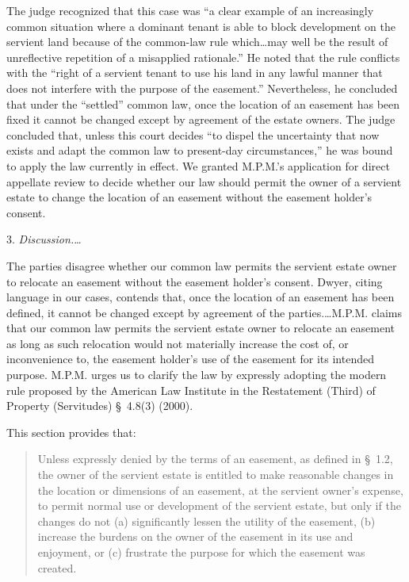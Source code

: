 The judge recognized that this case was ``a clear example of an increasingly
common situation where a dominant tenant is able to block development on the
servient land because of the common-law rule which\ldots may well be the result
of unreflective repetition of a misapplied rationale.'' He noted that the rule
conflicts with the ``right of a servient tenant to use his land in any lawful
manner that does not interfere with the purpose of the easement.'' Nevertheless,
he concluded that under the ``settled'' common law, once the location of an
easement has been fixed it cannot be changed except by agreement of the estate
owners. The judge concluded that, unless this court decides ``to dispel the
uncertainty that now exists and adapt the common law to present-day
circumstances,'' he was bound to apply the law currently in effect. We granted
M.P.M.'s application for direct appellate review to decide whether our law
should permit the owner of a servient estate to change the location of an
easement without the easement holder's consent.

3. \textit{Discussion.}\dots 

The parties disagree whether our common law permits the servient estate owner to
relocate an easement without the easement holder's consent. Dwyer, citing
language in our cases, contends that, once the location of an easement has been
defined, it cannot be changed except by agreement of the parties.\ldots M.P.M.
claims that our common law permits the servient estate owner to relocate an
easement as long as such relocation would not materially increase the cost of,
or inconvenience to, the easement holder's use of the easement for its intended
purpose. M.P.M. urges us to clarify the law by expressly adopting the modern
rule proposed by the American Law Institute in the Restatement (Third) of
Property (Servitudes) \S~4.8(3) (2000).

This section provides that:
\begin{quote}
Unless expressly denied by the terms of an easement, as defined in \S~1.2,
the owner of the servient estate is entitled to make reasonable changes in the
location or dimensions of an easement, at the servient owner's expense, to
permit normal use or development of the servient estate, but only if the changes
do not (a) significantly lessen the utility of the easement, (b) increase the
burdens on the owner of the easement in its use and enjoyment, or (c) frustrate
the purpose for which the easement was created.
\end{quote}

